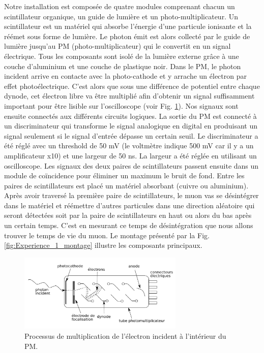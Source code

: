 \documentclass[12pt]{article}
\begin{document}
Notre installation est composée de quatre modules comprenant chacun un scintillateur organique, un guide de lumière et un photo-multiplicateur. Un scintillateur est un matériel qui absorbe l'énergie d'une particule ionisante et la réémet sous forme de lumière. Le photon émit est alors collecté par le guide de lumière jusqu'au PM (photo-multiplicateur) qui le convertit en un signal électrique. Tous les composants sont isolé de la lumière externe grâce à une couche d'aluminium et une couche de plastique noir. Dans le PM, le photon incident arrive en contacte avec la photo-cathode et y arrache un électron par effet photoélectrique. C'est alors que sous une différence de potentiel entre chaque dynode, cet électron libre va être multiplié afin d'obtenir un signal suffisamment important pour être lisible sur l'oscilloscope (voir Fig. \ref{fig:PM}).
Nos signaux sont ensuite connectés aux différents circuits logiques. La sortie du PM est connecté à un discriminateur qui transforme le signal analogique en digital en produisant un signal seulement si le signal d'entrée dépasse un certain seuil. Le discriminateur a été réglé avec un threshold de 50 mV (le voltmètre indique 500 mV car il y a un amplificateur x10) et une largeur de 50 ns. La largeur a été réglée en utilisant un oscilloscope. Les signaux des deux paires de scintillateurs passent ensuite dans un module de coïncidence pour éliminer un maximum le bruit de fond.
Entre les paires de scintillateurs est placé un matériel absorbant (cuivre ou aluminium). Après avoir traversé la première paire de scintillateurs, le muon vas se désintégrer dans le matériel et réémettre d'autres particules dans une direction aléatoire qui seront détectées soit par la paire de scintillateurs en haut ou alors du bas après un certain temps. C'est en mesurant ce temps de désintégration que nous allons trouver le temps de vie du muon. Le montage présenté par la Fig. \ref{fig:Experience_1_montage} illustre les composants principaux. 

\begin{figure}[htpb!]
    \centering
    \includegraphics[width=0.7\textwidth]{Images/Photos/PM.png}
    \captionsetup{width=0.9\textwidth}
    \caption{Processus de multiplication de l'électron incident à l'intérieur du PM.}
    \label{fig:PM}
\end{figure}
\end{document}
